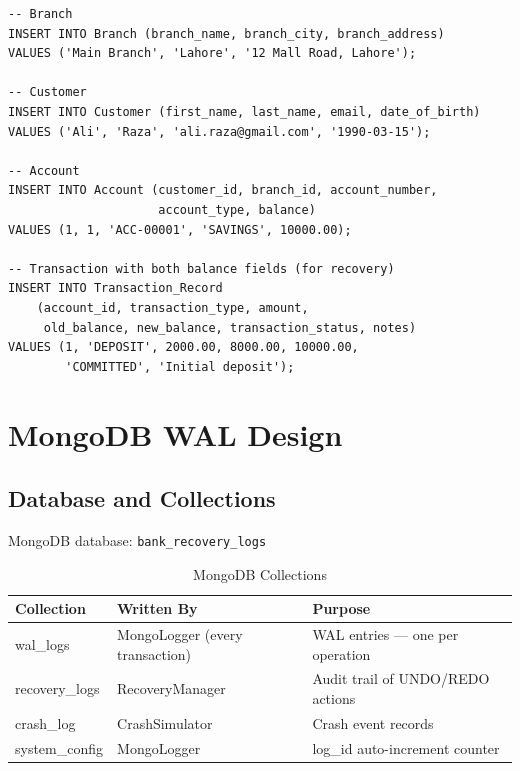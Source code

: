 \begin{lstlisting}[style=sqlstyle, caption={Sample INSERT statements}]
-- Branch
INSERT INTO Branch (branch_name, branch_city, branch_address)
VALUES ('Main Branch', 'Lahore', '12 Mall Road, Lahore');

-- Customer
INSERT INTO Customer (first_name, last_name, email, date_of_birth)
VALUES ('Ali', 'Raza', 'ali.raza@gmail.com', '1990-03-15');

-- Account
INSERT INTO Account (customer_id, branch_id, account_number,
                     account_type, balance)
VALUES (1, 1, 'ACC-00001', 'SAVINGS', 10000.00);

-- Transaction with both balance fields (for recovery)
INSERT INTO Transaction_Record
    (account_id, transaction_type, amount,
     old_balance, new_balance, transaction_status, notes)
VALUES (1, 'DEPOSIT', 2000.00, 8000.00, 10000.00,
        'COMMITTED', 'Initial deposit');
\end{lstlisting}

\chapter{MongoDB WAL Design}

\section{Database and Collections}

MongoDB database: \texttt{bank\_recovery\_logs}

\begin{table}[H]
\centering
\caption{MongoDB Collections}
\begin{tabularx}{\textwidth}{llX}
\toprule
\textbf{Collection} & \textbf{Written By} & \textbf{Purpose} \\
\midrule
wal\_logs       & MongoLogger (every transaction) & WAL entries — one per operation \\
recovery\_logs  & RecoveryManager                 & Audit trail of UNDO/REDO actions \\
crash\_log      & CrashSimulator                  & Crash event records \\
system\_config  & MongoLogger                     & log\_id auto-increment counter \\
\bottomrule
\end{tabularx}
\end{table}

